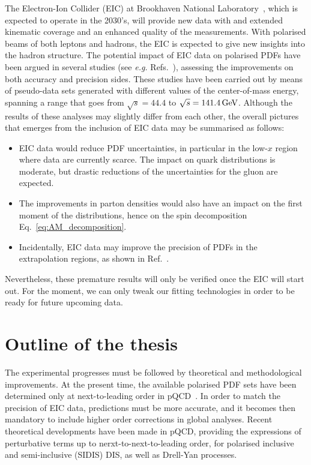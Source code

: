 The Electron-Ion Collider (EIC) at Brookhaven National Laboratory~\cite{AbdulKhalek:2021gbh}, which is expected to operate in the 2030's, 
will provide new data with and extended kinematic coverage and an enhanced quality of the measurements. With polarised beams of both leptons and hadrons, the EIC is expected to give new insights into the hadron structure. The potential impact of EIC data on polarised PDFs have been argued in several studies (see \textit{e.g.} Refs.~\cite{Borsa:2020lsz, Aschenauer:2012ve, Ball:2013tyh, Aschenauer:2015ata}), assessing the improvements on both accuracy and precision sides. These studies have been carried out by means of pseudo-data sets generated with different values of the center-of-mass energy, spanning a range that goes from $\sqrt{s} = 44.4$ to $\sqrt{s} = 141.4 \,\textrm{GeV}$. Although the results of these analyses may slightly differ from each other, the overall pictures that emerges from the inclusion of EIC data may be summarised as follows:
%
\begin{itemize}
  \item EIC data would reduce PDF uncertainties, in particular in the low-$x$ region where data are currently scarce. The impact on quark distributions is moderate, but drastic reductions of the uncertainties for the gluon are expected.
  \item The improvements in parton densities would also have an impact on the first moment of the distributions, hence on the spin decomposition Eq.~\eqref{eq:AM_decomposition}.
  \item Incidentally, EIC data may improve the precision of PDFs in the extrapolation regions, as shown in Ref.~\cite{Ball:2013tyh}.
\end{itemize}
%
Nevertheless, these premature results will only be verified once the EIC will start out. For the moment, we can only tweak our fitting technologies in order to be ready for future upcoming data.

\section{Outline of the thesis}

The experimental progresses must be followed by theoretical and methodological improvements. At the present time, the available polarised PDF sets have been determined only at next-to-leading order in pQCD~\cite{deFlorian:2008mr, Ethier:2017zbq, Nocera:2014gqa}. In order to match the precision of EIC data, predictions must be more accurate, and it becomes then mandatory to include higher order corrections in global analyses. Recent theoretical developments have been made in pQCD, providing the expressions of perturbative terms up to nerxt-to-next-to-leading order, for polarised inclusive and semi-inclusive (SIDIS) DIS, as well as Drell-Yan processes.%

